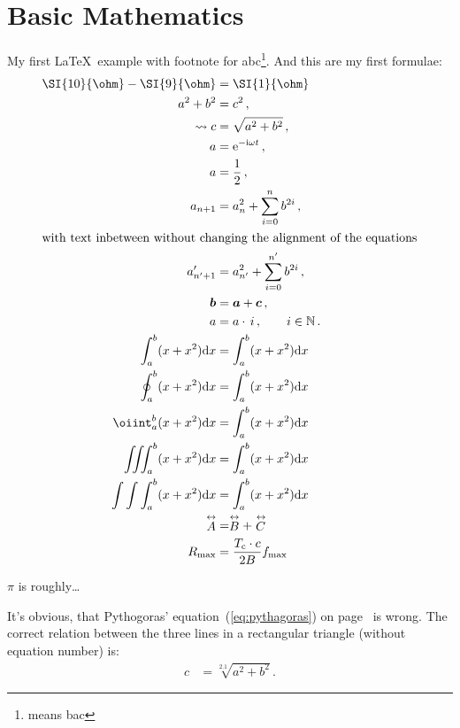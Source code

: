 \chapter{Basic Mathematics}
My first \LaTeX\ example with footnote for abc\footnote{means bac}. And this are my first formulae:
\begin{align}
  \SI{10}{\ohm} - \SI{9}{\ohm} &= \SI{1}{\ohm}\\
  a^2 + b^2 &= c^2\,,\nonumber\\
  \leadsto c &= \sqrt{a^2+b^2}\label{eq:pythagoras}\,,\\
  a &= \operatorname{e}^{-\mathrm{i}\omega t}\,,\\
  a &= \frac{1}{2}\,,\\
  a_{n+1} &= a_n^2+\sum_{i=0}^{n}b^{2i}\,,\\
  \intertext{with text inbetween without changing the alignment of the equations}
  a_{n'+1}' &= a_{n'}^2+\sum_{i=0}^{n'}b^{2i}\,,\\
  \boldsymbol{b} &= \boldsymbol{a }+ \boldsymbol{c}\,,\\
  a &= a\cdot\, i\,,\qquad i\in\mathbb{N}\,.\\
  \int_a^b (x+x^2)\mathrm{d} x &= \int_a^b (x+x^2)\mathrm{d} x\\
  \oint_a^b (x+x^2)\mathrm{d}x &= \int_a^b (x+x^2)\mathrm{d}x\\
  \oiint_a^b (x+x^2)\mathrm{d}x &= \int_a^b (x+x^2)\mathrm{d}x\\
  \iiint_a^b (x+x^2)\mathrm{d}x &= \int_a^b (x+x^2)\mathrm{d}x\\
  \int\int\int_a^b (x+x^2)\mathrm{d}x &= \int_a^b (x+x^2)\mathrm{d}x\\
  \stackrel{\leftrightarrow}{A} &= \stackrel{\leftrightarrow}{B}+\stackrel{\leftrightarrow}{C}\\
  R_{\text{max}}& = \frac{T_{\mathrm{c}} \cdot c}{2 B} f_{\mathrm{max}}
\end{align}

$\pi$ is roughly\ldots

It's obvious, that Pythogoras' equation~(\ref{eq:pythagoras}) on page~\pageref{eq:pythagoras} is
wrong. The correct relation between the three lines in a rectangular triangle (without equation
number) is:
\begin{align*}
  c &= \sqrt[2.1]{a^2+b^2}\,.
\end{align*}

